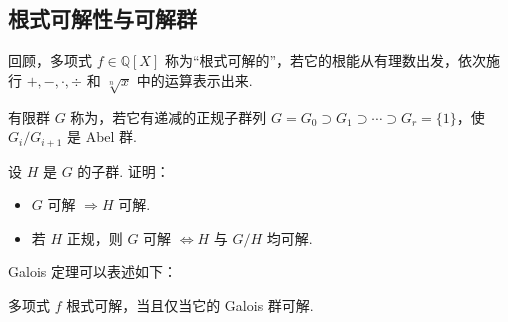 \subsection{根式可解性与可解群}\label{sec:galois-2-8-2}
回顾，多项式 $f\in\mathbb Q[X]$ 称为``根式可解的''，若它的根能从有理数出发，依次施行 $+,-,\cdot,\div$ 和 $\sqrt[n]{x}$ 中的运算表示出来.
\begin{definition*}
有限群 $G$ 称为，若它有递减的正规子群列 $G=G_0\supset G_1\supset\cdots\supset G_r=\{1\}$，使 $G_i/G_{i+1}$ 是 Abel 群.
\end{definition*}
\begin{exercise*}
设 $H$ 是 $G$ 的子群. 证明：
\begin{itemize}
\item $G$ 可解 $\Rightarrow H$ 可解.
\item 若 $H$ 正规，则 $G$ 可解 $\Leftrightarrow H$ 与 $G/H$ 均可解.
\end{itemize}
\end{exercise*}
Galois 定理可以表述如下：
\begin{theorem*}
多项式 $f$ 根式可解，当且仅当它的 Galois 群可解.
\end{theorem*}
